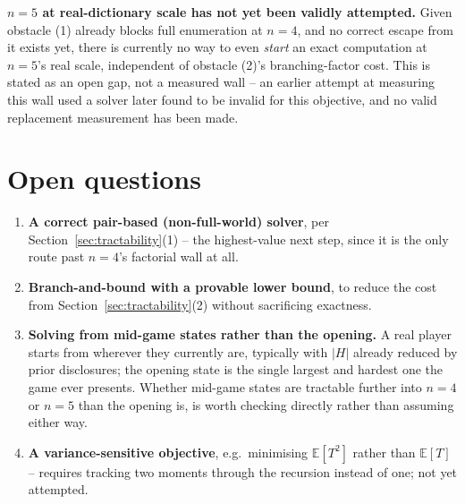 \documentclass[11pt]{article}
\begin{document}
\textbf{$n=5$ at real-dictionary scale has not yet been validly
attempted.} Given obstacle (1) already blocks full enumeration at $n=4$,
and no correct escape from it exists yet, there is currently no way to
even \emph{start} an exact computation at $n=5$'s real scale, independent
of obstacle (2)'s branching-factor cost. This is stated as an open gap,
not a measured wall -- an earlier attempt at measuring this wall used a
solver later found to be invalid for this objective, and no valid
replacement measurement has been made.

\section{Open questions}
\label{sec:next}

\begin{enumerate}
  \item \textbf{A correct pair-based (non-full-world) solver}, per
  Section~\ref{sec:tractability}(1) -- the highest-value next step, since
  it is the only route past $n=4$'s factorial wall at all.
  \item \textbf{Branch-and-bound with a provable lower bound}, to reduce
  the cost from Section~\ref{sec:tractability}(2) without sacrificing
  exactness.
  \item \textbf{Solving from mid-game states rather than the opening.} A
  real player starts from wherever they currently are, typically with
  $|H|$ already reduced by prior disclosures; the opening state is the
  single largest and hardest one the game ever presents. Whether
  mid-game states are tractable further into $n=4$ or $n=5$ than the
  opening is, is worth checking directly rather than assuming either way.
  \item \textbf{A variance-sensitive objective}, e.g.\ minimising
  $\mathbb{E}[T^2]$ rather than $\mathbb{E}[T]$ -- requires tracking two
  moments through the recursion instead of one; not yet attempted.
\end{enumerate}
\end{document}
